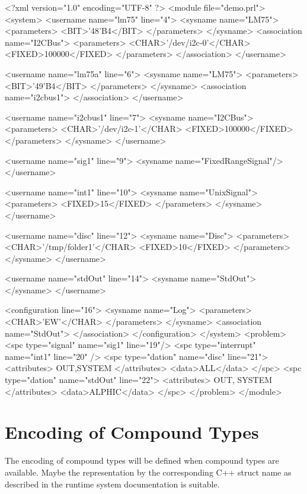 \begin{XMLCode}
<?xml version="1.0" encoding="UTF-8" ?>
<module file="demo.prl">
<system>
<username name="lm75" line="4">
   <sysname name="LM75">
   <parameters>
   <BIT>'48'B4</BIT>
   </parameters>
   </sysname>
   <association name="I2CBus">
      <parameters>
        <CHAR>'/dev/i2c-0'</CHAR>
        <FIXED>100000</FIXED>
      </parameters>
   </association>
</username>

<username name="lm75a" line="6">
   <sysname name="LM75">
   <parameters>
   <BIT>'49'B4</BIT>
   </parameters>
   </sysname>
   <association name="i2cbus1">
   </association>
</username>

<username name="i2cbus1" line="7">
   <sysname name="I2CBus">
      <parameters>
        <CHAR>'/dev/i2c-1'</CHAR>
        <FIXED>100000</FIXED>
      </parameters>
   </sysname>
</username>

<username name="sig1" line="9">
   <sysname name="FixedRangeSignal"/>
</username>

<username name="int1" line="10">
  <sysname name="UnixSignal">
    <parameters>
      <FIXED>15</FIXED>
    </parameters>
  </sysname>
</username>

<username name="disc" line="12">
  <sysname name="Disc">
     <parameters>
       <CHAR>'/tmp/folder1'</CHAR>
       <FIXED>10</FIXED>
     </parameters>
  </sysname>
</username>

<username name="stdOut" line="14">
  <sysname name="StdOut">
  </sysname>
</username> 

<configuration line="16">
  <sysname name="Log">
    <parameters>
     <CHAR>'EW'</CHAR>
    </parameters>
  </sysname>
  <association name="StdOut">
  </association>
</configuration>
</system>
<problem>
   <spc type="signal" name="sig1" line="19"/>
   <spc type="interrupt" name="int1" line="20" />
   <spc type="dation" name="disc" line="21">
      <attributes> OUT,SYSTEM </attributes>
      <data>ALL</data>
   </spc>
   <spc type="dation" name="stdOut" line="22">
      <attributes> OUT, SYSTEM </attributes>
      <data>ALPHIC</data>
   </spc>
</problem>
</module>
\end{XMLCode}

\section{Encoding of Compound Types}
The encoding of compound types will be defined when compound types are 
available. Maybe the representation by the corresponding  C++ struct name
as described in the runtime system documentation \cite{runtime} is
suitable.


